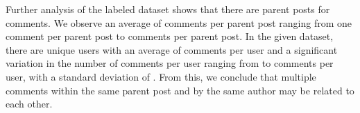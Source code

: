 \documentclass[runningheads]{llncs}
\begin{document}
Further analysis of the labeled dataset shows that there are  parent posts for  comments. We observe an average of  comments per parent post ranging from one comment per parent post to  comments per parent post. In the given dataset, there are  unique users with an average of  comments per user and a significant variation in the number of comments per user ranging from  to  comments per user, with a standard deviation of . From this, we conclude that multiple comments within the same parent post and by the same author may be related to each other.
\begin{table}[]
\centering
{}
\end{table}
\end{document}
